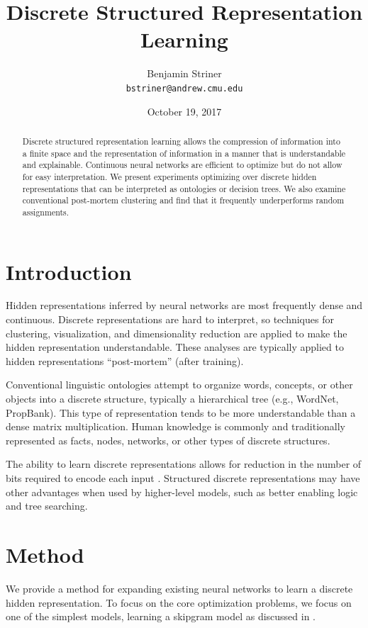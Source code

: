 \documentclass[11pt,letterpaper]{article}
\title{Discrete Structured Representation Learning}
\author{Benjamin Striner \\
  {\tt bstriner@andrew.cmu.edu} \\}
\date{October 19, 2017}
\begin{document}
\maketitle
\begin{abstract}
Discrete structured representation learning allows the compression of information into a finite space and the representation of information in a manner that is understandable and explainable. Continuous neural networks are efficient to optimize but do not allow for easy interpretation. We present experiments optimizing over discrete hidden representations that can be interpreted as ontologies or decision trees. We also examine conventional post-mortem clustering and find that it frequently underperforms random assignments.
\end{abstract}

\section{Introduction}

Hidden representations inferred by neural networks are most frequently dense and continuous. Discrete representations are hard to interpret, so techniques for clustering, visualization, and dimensionality reduction are applied to make the hidden representation understandable. These analyses are typically applied to hidden representations ``post-mortem'' (after training).

Conventional linguistic ontologies attempt to organize words, concepts, or other objects into a discrete structure, typically a hierarchical tree (e.g., WordNet, PropBank). This type of representation tends to be more understandable than a dense matrix multiplication. Human knowledge is commonly and traditionally represented as facts, nodes, networks, or other types of discrete structures.

The ability to learn discrete representations allows for reduction in the number of bits required to encode each input \cite{Hu17}.
Structured discrete representations may have other advantages when used by higher-level models, such as better enabling logic and tree searching.

\section{Method}

We provide a method for expanding existing neural networks to learn a discrete hidden representation. To focus on the core optimization problems, we focus on one of the simplest models, learning a skipgram model as discussed in \cite{Mikolov1301} \cite{MikolovSCCD13}.
\end{document}
